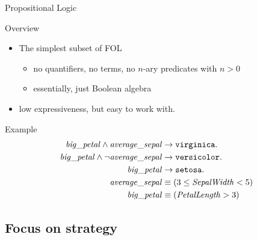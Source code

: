 \documentclass[presentation]{beamer}\mode<presentation>{\usetheme{AMSBolognaFC}}
\begin{document}
\begin{frame}[allowframebreaks]{Propositional Logic}
    \begin{block}{Overview}
        \begin{itemize}
            \item The simplest subset of FOL
            \begin{itemize}
                \item no quantifiers, no terms, no $n$-ary predicates with $n>0$
                \item essentially, just Boolean algebra 
            \end{itemize}

            \bigskip

            \item low expressiveness, but easy to work with.
        \end{itemize}
    \end{block}
    
    \begin{exampleblock}{Example}
        \begin{equation*}
            \begin{aligned}
                \mathit{big\_petal}\wedge\mathit{average\_sepal}&\rightarrow\mathtt{virginica}.\\
                \mathit{big\_petal}\wedge\neg\mathit{average\_sepal}&\rightarrow\mathtt{versicolor}.\\
                \mathit{big\_petal}&\rightarrow\mathtt{setosa}.\\
                \mathit{average\_sepal}&\equiv(3\le\mathit{SepalWidth}<5)\\
                \mathit{big\_petal}&\equiv(\mathit{PetalLength}>3)\\
            \end{aligned}    
        \end{equation*}
    \end{exampleblock}
\end{frame}

\subsection{Focus on strategy}
\end{document}
